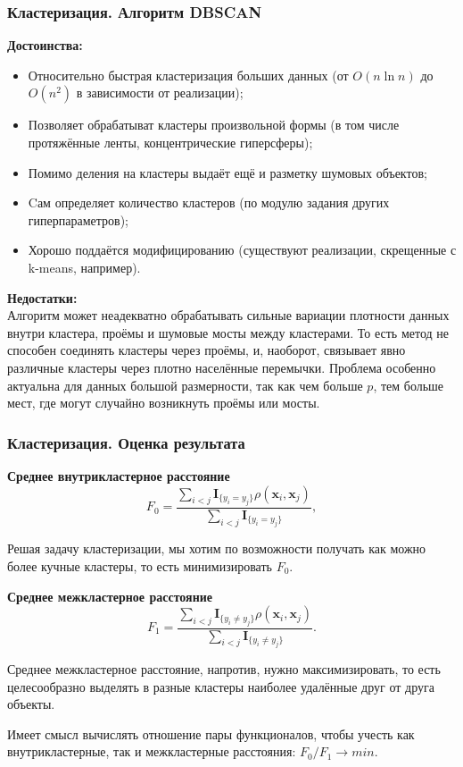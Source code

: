 \documentclass[ucs, notheorems, handout]{beamer}
\begin{document}
	\begin{frame}
	\frametitle{Кластеризация. Алгоритм DBSCAN}
	

	\textbf{Достоинства:} 
\begin{itemize}
	\item Относительно быстрая кластеризация больших данных (от $O(n \ln n)$ до $O(n^2)$ в зависимости от реализации); 
	\item Позволяет обрабатыват кластеры произвольной формы (в том числе протяжённые ленты, концентрические гиперсферы); 
	\item Помимо деления на кластеры выдаёт ещё и разметку шумовых объектов; 
	\item Cам определяет количество кластеров (по модулю задания других гиперпараметров);
	\item Хорошо поддаётся модифицированию (существуют реализации, скрещенные с k-means, например). 
\end{itemize}

\textbf{Недостатки:}\\ 
	Алгоритм может неадекватно обрабатывать сильные вариации плотности данных внутри кластера, проёмы и шумовые мосты между кластерами.
	То есть метод не способен соединять кластеры через проёмы, и, наоборот, связывает явно различные кластеры через плотно населённые перемычки. Проблема особенно актуальна для данных большой размерности, так как чем больше $p$, тем больше мест, где могут случайно возникнуть проёмы или мосты.

	\end{frame}
	
	\begin{frame}
	\frametitle{Кластеризация. Оценка результата}
	

	\textbf{Среднее внутрикластерное расстояние} 
$$F_0 = \frac{\sum_{i < j}\mathbf{I}_{\{y_i = y_j\}}\rho(\pmb x_i, \pmb x_j)}{\sum_{i < j}\mathbf{I}_{\{y_i = y_j\}}},$$ 

Решая задачу кластеризации, мы хотим по возможности получать как можно более кучные кластеры, то есть минимизировать $F_0$.

	\textbf{Среднее межкластерное расстояние} 
	$$F_1 = \frac{\sum_{i < j}\mathbf{I}_{\{y_i \neq y_j\}}\rho(\pmb x_i, \pmb x_j)}{\sum_{i < j}\mathbf{I}_{\{y_i \neq y_j\}}}.$$

Среднее межкластерное расстояние, напротив, нужно максимизировать, то есть целесообразно выделять в разные кластеры наиболее удалённые друг от друга объекты.

Имеет смысл вычислять отношение пары функционалов, чтобы учесть как внутрикластерные, так и межкластерные расстояния: $F_0/F_1 \rightarrow min$.

	\end{frame}
	
\end{document}
